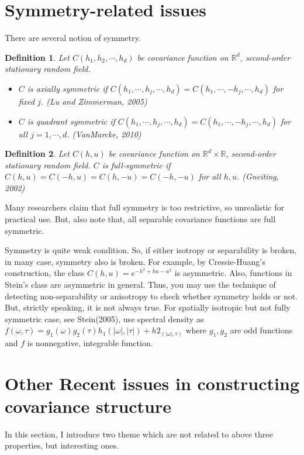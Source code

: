 \documentclass{article}
\newtheorem*{definition}{Definition}
\begin{document}
{\section{Symmetry-related issues}
There are several notion of symmetry.
\begin{definition}
    Let $C(h_1,h_2,\cdots,h_d)$ be covariance function on $\mathbb R^d$, second-order stationary random field.
    \begin{itemize}
        \item $C$ is axially symmetric if $C(h_1,\cdots,h_j,\cdots,h_d)=C(h_1,\cdots,-h_j,\cdots,h_d)$ for fixed $j$. (Lu and Zimmerman, 2005)
        \item $C$ is quadrant symmetric if $C(h_1,\cdots,h_j,\cdots,h_d)=C(h_1,\cdots,-h_j,\cdots,h_d)$ for all $j=1,\cdots,d$. (VanMarcke, 2010)
    \end{itemize}
\end{definition}
\begin{definition}
    Let $C(h,u)$ be covariance function on $\mathbb R^d \times \mathbb R$, second-order stationary random field.
    $C$ is full-symmetric if $C(h,u)=C(-h,u)=C(h,-u)=C(-h,-u)$ for all $h,u$. (Gneiting, 2002)
\end{definition}
Many researchers claim that full symmetry is too restrictive, so unrealistic for practical use.
But, also note that, all separable covariance functions are full symmetric.

Symmetry is quite weak condition. So, if either isotropy or separability is broken, in many case, symmetry also is broken.
For example, by Cressie-Huang's construction, the class $C(h,u)=e^{-h^2+hu-u^2}$ is asymmetric. Also, functions in Stein's class are asymmetric in general.
Thus, you may use the technique of detecting non-separability or anisotropy to check whether symmetry holds or not.
But, strictly speaking, it is not always true. For spatially isotropic but not fully symmetric case, see Stein(2005), use spectral density as
\(f(\omega,\tau)=g_1(\omega)g_2(\tau)h_1(|\omega|,|\tau|)+h2_(|\omega|,\tau)\) where $g_1,g_2$ are odd functions and $f$ is nonnegative, integrable function.




\section{Other Recent issues in constructing covariance structure}

In this section, I introduce two theme which are not related to above three properties, but interesting ones.

}
\end{document}
